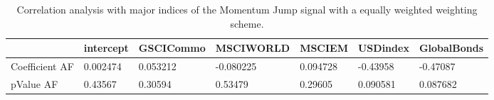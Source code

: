 \begin{table}[H]
\centering
\begin{tabular}{lllllll}
& intercept & GSCICommo & MSCIWORLD & MSCIEM & USDindex & GlobalBonds \\ 
\hline 
Coefficient AF & 0.002474 & 0.053212 & -0.080225 & 0.094728 & -0.43958 & -0.47087 \\ 
pValue AF & 0.43567 & 0.30594 & 0.53479 & 0.29605 & 0.090581 & 0.087682 \\ 
\hline
\end{tabular}
\caption{Correlation analysis with major indices of the Momentum Jump signal with a equally weighted weighting scheme.}
\label{MOMJUMPEW_AFACTOR}
\end{table}